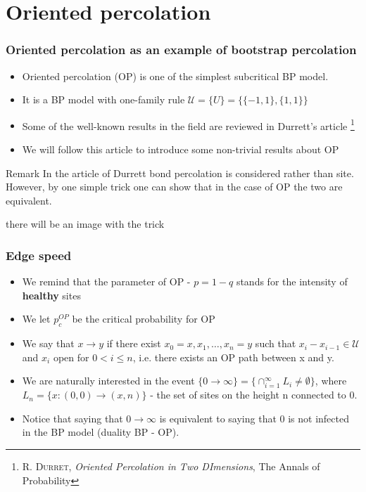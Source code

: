 
\section{Oriented percolation}

\begin{frame}
	\frametitle{Oriented percolation as an example of  bootstrap percolation}
	
\begin{itemize}
\item Oriented percolation (OP) is one of the simplest subcritical BP model.
\item It is a BP model with one-family rule $\mathcal{U} = \{U\} = \{\{-1, 1\}, \{1, 1\}\}$
\item Some of the well-known results in the field are reviewed in Durrett's article \footnote{R. \textsc{Durret}, \emph{Oriented Percolation in Two DImensions}, The Annals of Probability}
\item We will follow this article to introduce some non-trivial results about OP
\end{itemize}

\begin{alertblock}{Remark}
	In the article of Durrett bond percolation is considered rather than site. However, by one simple trick one can show that in the case of OP the two are equivalent.
\end{alertblock}

\end{frame}

\begin{frame}
	there will be an image with the trick
\end{frame}

\begin{frame}
	\frametitle{Edge speed}
	\begin{itemize}
		\item We remind that the parameter of OP - $p = 1 - q$ stands for the intensity of \textbf{healthy} sites
		\item We let $p_{c}^{OP}$ be the critical probability for OP
		\item We say that $x \rightarrow y$  if there exist $x_{0} = x, x_{1}, \ldots, x_{n} = y$ such that $x_{i} - x_{i - 1} \in \mathcal{U}$ and $x_{i}$ open for $0 < i \leq n$, i.e. there exists an OP path between x and y.
		\item We are naturally interested in the event $\{0 \rightarrow \infty \} = \{ \cap_{i = 1}^{\infty} L_{i} \neq \emptyset \}$, where $L_{n} = \{x: (0, 0) \rightarrow (x, n) \}$ - the set of sites on the height n connected to 0.
		\item Notice that saying that $0 \rightarrow \infty$ is equivalent to saying that 0 is not infected in the BP model (duality BP - OP).
	\end{itemize}
\end{frame}
	
